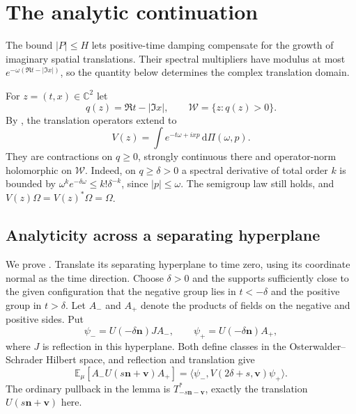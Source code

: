 \documentclass[11pt, letterpaper, reqno]{amsart}
\theoremstyle{definition}
\theoremstyle{remark}
\newcommand{\bbC}{\mathbb{C}}
\newcommand{\bbE}{\mathbb{E}}
\newcommand{\calW}{\mathcal{W}}
\newcommand{\bfn}{\mathbf{n}}
\newcommand{\bfv}{\mathbf{v}}
\newcommand{\dd}{\,\mathrm{d}}
\begin{document}
\section{The analytic continuation}\label{sec:analytic}

The bound $|P|\leq H$ lets positive-time damping compensate for the
growth of imaginary spatial translations. Their spectral multipliers
have modulus at most $e^{-\omega(\Re t-|\Im x|)}$, so the quantity
below determines the complex translation domain.

For $z=(t,x)\in\bbC^2$ let
\begin{equation}\label{eq:tube}
 q(z)=\Re t-|\Im x|,\qquad\calW=\{z:q(z)>0\}.
\end{equation}
By , the translation operators extend to
\begin{equation}\label{eq:complex-translations}
 V(z)=\int e^{-t\omega+ixp}\dd\Pi(\omega,p).
\end{equation}
They are contractions on $q\geq0$, strongly continuous there and
operator-norm holomorphic on $\calW$. Indeed, on $q\geq\delta>0$ a
spectral derivative of total order $k$ is bounded by
$\omega^ke^{-\delta\omega}\leq k!\delta^{-k}$, since $|p|\leq\omega$.
The semigroup law still holds, and $V(z)\Omega=V(z)^*\Omega=\Omega$.

\subsection{Analyticity across a separating hyperplane}
\label{subsec:cluster-analyticity}

We prove . Translate its separating hyperplane
to time zero, using its coordinate normal as the time direction.
Choose $\delta>0$ and the supports sufficiently close to the given
configuration that the negative group lies in $t<-\delta$ and the
positive group in $t>\delta$. Let $A_-$ and
$A_+$ denote the products of fields on the negative and positive
sides. Put
\begin{equation}
 \psi_-=U(-\delta\bfn)J A_-,\qquad
 \psi_+=U(-\delta\bfn)A_+,
\end{equation}
where $J$ is reflection in this hyperplane. Both define classes in
the Osterwalder--Schrader Hilbert space, and reflection and translation give
\begin{equation}\label{eq:cluster-matrix-element}
 \bbE_\mu[A_-U(s\bfn+\bfv)A_+]
   =\langle\psi_-,V(2\delta+s,\bfv)\psi_+\rangle.
\end{equation}
The ordinary pullback in the lemma is
$T_{-s\bfn-\bfv}^*$, exactly the translation $U(s\bfn+\bfv)$ here.
\end{document}
